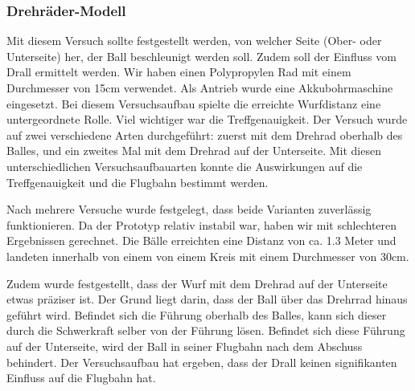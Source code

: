 \subsubsection{Drehräder-Modell}
Mit diesem Versuch sollte festgestellt werden, von welcher Seite (Ober- oder Unterseite) her, der Ball beschleunigt werden soll. Zudem soll der Einfluss vom Drall ermittelt werden. Wir haben einen Polypropylen Rad mit einem Durchmesser von 15cm verwendet. Als Antrieb wurde eine Akkubohrmaschine eingesetzt. Bei diesem Versuchsaufbau spielte die erreichte Wurfdistanz eine untergeordnete Rolle. Viel wichtiger war die Treffgenauigkeit.  
Der Versuch wurde auf zwei verschiedene Arten durchgeführt: zuerst mit dem Drehrad oberhalb des Balles, und ein zweites Mal mit dem Drehrad auf der Unterseite. Mit diesen unterschiedlichen Versuchsaufbauarten konnte die Auswirkungen auf die Treffgenauigkeit und die Flugbahn bestimmt werden.

Nach mehrere Versuche wurde festgelegt, dass beide Varianten zuverlässig funktionieren. Da der Prototyp relativ instabil war, haben wir mit schlechteren Ergebnissen gerechnet. Die Bälle erreichten eine Distanz von ca. 1.3 Meter und landeten innerhalb von einem von einem Kreis mit einem Durchmesser von 30cm. 

Zudem wurde festgestellt, dass der Wurf mit dem Drehrad auf der Unterseite etwas präziser ist. Der Grund liegt darin, dass der Ball über das Drehrrad hinaus geführt wird. Befindet sich die Führung oberhalb des Balles, kann sich dieser durch die Schwerkraft selber von der Führung lösen. Befindet sich diese Führung auf der Unterseite, wird der Ball in seiner Flugbahn nach dem Abschuss behindert. Der Versuchsaufbau hat ergeben, dass der Drall keinen signifikanten Einfluss auf die Flugbahn hat.

